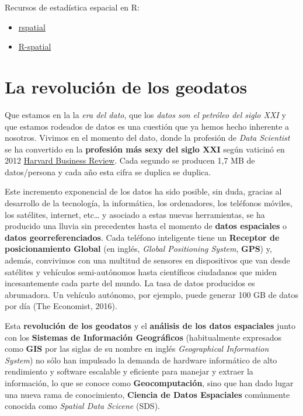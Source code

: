 \documentclass[
]{report}
\providecommand{\tightlist}{%
  \setlength{\itemsep}{0pt}\setlength{\parskip}{0pt}}
\theoremstyle{definition}
\theoremstyle{definition}
\theoremstyle{definition}
\theoremstyle{definition}
\theoremstyle{remark}
\begin{document}
Recursos de estadística espacial en R:

\begin{itemize}
\tightlist
\item
  \href{https://rspatial.org/}{rspatial}
\item
  \href{https://r-spatial.org/projects/}{R-spatial}
\end{itemize}

\hypertarget{la-revoluciuxf3n-de-los-geodatos}{%
\chapter{La revolución de los geodatos}\label{la-revoluciuxf3n-de-los-geodatos}}

Que estamos en la la \emph{era del dato}, que los \emph{datos son el petróleo del siglo
XXI} y que estamos rodeados de datos es una cuestión que ya hemos hecho
inherente a nosotros. Vivimos en el momento del dato, donde la profesión de
\emph{Data Scientist} se ha convertido en la \textbf{profesión más sexy del siglo XXI}
según vaticinó en 2012 \href{https://hbr.org/2012/10/data-scientist-the-sexiest-job-of-the-21st-century}{Harvard Business
Review}.
Cada segundo se producen 1,7 MB de datos/persona y cada año esta cifra se
duplica se duplica.

Este incremento exponencial de los datos ha sido posible, sin duda, gracias al
desarrollo de la tecnología, la informática, los ordenadores, los teléfonos
móviles, los satélites, internet, etc\ldots{} y asociado a estas nuevas herramientas,
se ha producido una lluvia sin precedentes hasta el momento de \textbf{datos
espaciales} o \textbf{datos georreferenciados}. Cada teléfono inteligente tiene un
\textbf{Receptor de posicionamiento Global} (en inglés, \emph{Global Positioning System},
\textbf{GPS}) y, además, convivimos con una multitud de sensores en dispositivos que
van desde satélites y vehículos semi-autónomos hasta científicos ciudadanos que
miden incesantemente cada parte del mundo. La tasa de datos producidos es
abrumadora. Un vehículo autónomo, por ejemplo, puede generar 100 GB de datos por
día (The Economist, 2016).

Esta \textbf{revolución de los geodatos} y el \textbf{análisis de los datos espaciales}
junto con los \textbf{Sistemas de Información Geográficos} (habitualmente expresados
como \textbf{GIS} por las siglas de su nombre en inglés \emph{Geographical Information
System}) no sólo han impulsado la demanda de hardware informático de alto
rendimiento y software escalable y eficiente para manejar y extraer la
información, lo que se conoce como \textbf{Geocomputación}, sino que han dado lugar
una nueva rama de conocimiento, \textbf{Ciencia de Datos Espaciales} comúnmente
conocida como \emph{Spatial Data Scicene} (SDS).
\end{document}
